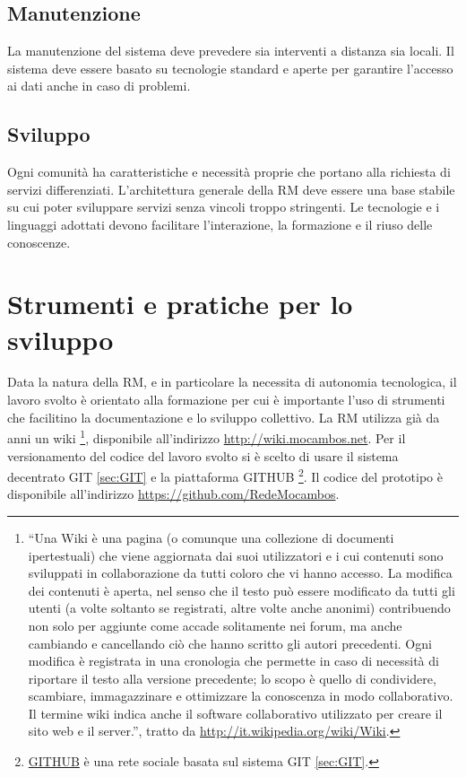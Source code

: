 \subsection{Manutenzione}
La manutenzione del sistema deve prevedere sia interventi a distanza
sia locali. Il sistema deve essere basato su tecnologie standard e
aperte per garantire l'accesso ai dati anche in caso di problemi.

\subsection{Sviluppo}
Ogni comunità ha caratteristiche e necessità proprie che portano alla
richiesta di servizi differenziati. L'architettura generale della RM
deve essere una base stabile su cui poter sviluppare servizi senza
vincoli troppo stringenti. Le tecnologie e i linguaggi adottati devono
facilitare l'interazione, la formazione e il riuso delle conoscenze. 

\section{Strumenti e pratiche per lo sviluppo}
Data la natura della RM, e in particolare la necessita di autonomia
tecnologica, il lavoro svolto è orientato alla formazione per cui è
importante l'uso di strumenti che facilitino la documentazione e lo
sviluppo collettivo. La RM utilizza già da anni un wiki
\footnote{``Una Wiki è una pagina (o comunque una collezione di
  documenti ipertestuali) che viene aggiornata dai suoi utilizzatori e
  i cui contenuti sono sviluppati in collaborazione da tutti coloro
  che vi hanno accesso. La modifica dei contenuti è aperta, nel senso
  che il testo può essere modificato da tutti gli utenti (a volte
  soltanto se registrati, altre volte anche anonimi) contribuendo non
  solo per aggiunte come accade solitamente nei forum, ma anche
  cambiando e cancellando ciò che hanno scritto gli autori precedenti.
  Ogni modifica è registrata in una cronologia che permette in caso di
  necessità di riportare il testo alla versione precedente; lo scopo è
  quello di condividere, scambiare, immagazzinare e ottimizzare la
  conoscenza in modo collaborativo. Il termine wiki indica anche il
  software collaborativo utilizzato per creare il sito web e il
  server.'', tratto da \url{http://it.wikipedia.org/wiki/Wiki}.},
disponibile all'indirizzo \url{http://wiki.mocambos.net}.  Per il
versionamento del codice del lavoro svolto si è scelto di usare il
sistema decentrato GIT \ref{sec:GIT} e la piattaforma GITHUB
\footnote{\href{http://github.com}{GITHUB} è una rete sociale basata
  sul sistema GIT \ref{sec:GIT}.}. Il codice del prototipo è disponibile
all'indirizzo \url{https://github.com/RedeMocambos}.

